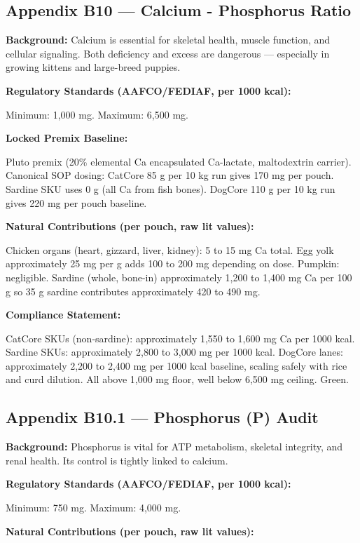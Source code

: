 \subsection*{Appendix B10 --- Calcium - Phosphorus Ratio}

\textbf{Background:}  
Calcium is essential for skeletal health, muscle function, and cellular signaling. Both deficiency and excess are dangerous --- especially in growing kittens and large-breed puppies.  

\textbf{Regulatory Standards (AAFCO/FEDIAF, per 1000 kcal):}  

Minimum: 1,000 mg. Maximum: 6,500 mg.

\textbf{Locked Premix Baseline:}  

Pluto premix (20\% elemental Ca encapsulated Ca-lactate, maltodextrin carrier). Canonical SOP dosing: CatCore 85 g per 10 kg run gives 170 mg per pouch. Sardine SKU uses 0 g (all Ca from fish bones). DogCore 110 g per 10 kg run gives 220 mg per pouch baseline.

\textbf{Natural Contributions (per pouch, raw lit values):}  

Chicken organs (heart, gizzard, liver, kidney): 5 to 15 mg Ca total. Egg yolk approximately 25 mg per g adds 100 to 200 mg depending on dose. Pumpkin: negligible. Sardine (whole, bone-in) approximately 1,200 to 1,400 mg Ca per 100 g so 35 g sardine contributes approximately 420 to 490 mg.

\textbf{Compliance Statement:}  

CatCore SKUs (non-sardine): approximately 1,550 to 1,600 mg Ca per 1000 kcal. Sardine SKUs: approximately 2,800 to 3,000 mg per 1000 kcal. DogCore lanes: approximately 2,200 to 2,400 mg per 1000 kcal baseline, scaling safely with rice and curd dilution. All above 1,000 mg floor, well below 6,500 mg ceiling. Green.

\subsection*{Appendix B10.1 --- Phosphorus (P) Audit}

\textbf{Background:}  
Phosphorus is vital for ATP metabolism, skeletal integrity, and renal health. Its control is tightly linked to calcium.  

\textbf{Regulatory Standards (AAFCO/FEDIAF, per 1000 kcal):}  

Minimum: 750 mg. Maximum: 4,000 mg.

\textbf{Natural Contributions (per pouch, raw lit values):}  

